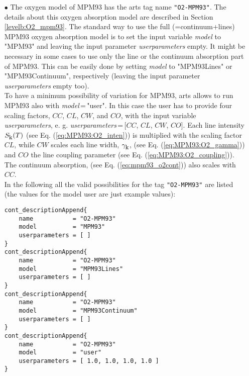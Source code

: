 {\begin{itemize}
\item[$\bullet$] The oxygen model of MPM93 \citep{liebeetal:93}
     has the arts tag name {\tt "O2-MPM93"}. The details about this 
     oxygen absorption model are described in Section \ref{levelb:O2_mpm93}. 
     The standard way to use the full (=continuum+lines) MPM93 oxygen 
     absorption model is to set the input variable {\it model} 
     to "MPM93" and leaving the input parameter {\it userparameters} empty. 
     It might be necessary in some cases to use only the line or the 
     continuum absorption part of MPM93. This can be easily done 
     by setting {\it model} to "MPM93Lines" or "MPM93Continuum", 
     respectively (leaving the input parameter {\it userparameters} 
     empty too).\\ To have a minimum possibility of variation for MPM93, 
     arts allows to run MPM93 also with {\it model}\,=\,"user". 
     In this case the user has to provide four scaling factors,  
     $CC$, $CL$, $CW$, and $CO$, with the input variable {\it userparameters}, 
     e. g. {\it userparameters}\,=\,$[$$CC$, $CL$, $CW$, $CO$$]$. 
     Each line intensity $S_{\mbox{\rm \small k}}(T)$ (see Eq. (\ref{eq:MPM93:O2_inten})) 
     is multiplied with the scaling factor $CL$, while $CW$ scales 
     each line width, $\gamma_{\mbox{\rm \small k}}$, (see Eq. (\ref{eq:MPM93:O2_gamma})) and 
     $CO$ the line coupling parameter (see Eq. (\ref{eq:MPM93:O2_coupling})). 
     The continuum absorption, (see Eq. (\ref{eq:mpm93_o2cont})) 
     also scales with $CC$.\\
     In the following all the valid possibilities for the
     tag {\tt "O2-MPM93"} are listed (the values for the 
     model user are just example values):
\begin{verbatim}
cont_descriptionAppend{
    name           = "O2-MPM93"
    model          = "MPM93"
    userparameters = [ ]
}
cont_descriptionAppend{
    name           = "O2-MPM93"
    model          = "MPM93Lines"
    userparameters = [ ]
}
cont_descriptionAppend{
    name           = "O2-MPM93"
    model          = "MPM93Continuum"
    userparameters = [ ]
}
cont_descriptionAppend{
    name           = "O2-MPM93"
    model          = "user"
    userparameters = [ 1.0, 1.0, 1.0, 1.0 ]
}
\end{verbatim}


\end{itemize}}
